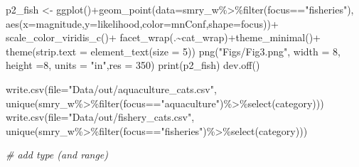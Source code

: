 \documentclass[
]{article}
\newenvironment{Shaded}{\begin{snugshade}}{\end{snugshade}}
\newcommand{\AttributeTok}[1]{\textcolor[rgb]{0.77,0.63,0.00}{#1}}
\newcommand{\CommentTok}[1]{\textcolor[rgb]{0.56,0.35,0.01}{\textit{#1}}}
\newcommand{\DecValTok}[1]{\textcolor[rgb]{0.00,0.00,0.81}{#1}}
\newcommand{\FunctionTok}[1]{\textcolor[rgb]{0.00,0.00,0.00}{#1}}
\newcommand{\NormalTok}[1]{#1}
\newcommand{\OtherTok}[1]{\textcolor[rgb]{0.56,0.35,0.01}{#1}}
\newcommand{\SpecialCharTok}[1]{\textcolor[rgb]{0.00,0.00,0.00}{#1}}
\newcommand{\StringTok}[1]{\textcolor[rgb]{0.31,0.60,0.02}{#1}}
\begin{document}
\begin{Shaded}
\begin{Highlighting}[]
\NormalTok{    p2\_fish }\OtherTok{\textless{}{-}} \FunctionTok{ggplot}\NormalTok{()}\SpecialCharTok{+}\FunctionTok{geom\_point}\NormalTok{(}\AttributeTok{data=}\NormalTok{smry\_w}\SpecialCharTok{\%\textgreater{}\%}\FunctionTok{filter}\NormalTok{(focus}\SpecialCharTok{==}\StringTok{"fisheries"}\NormalTok{),}
                            \FunctionTok{aes}\NormalTok{(}\AttributeTok{x=}\NormalTok{magnitude,}\AttributeTok{y=}\NormalTok{likelihood,}\AttributeTok{color=}\NormalTok{mnConf,}\AttributeTok{shape=}\NormalTok{focus))}\SpecialCharTok{+}
      \FunctionTok{scale\_color\_viridis\_c}\NormalTok{()}\SpecialCharTok{+}
      \FunctionTok{facet\_wrap}\NormalTok{(.}\SpecialCharTok{\textasciitilde{}}\NormalTok{cat\_wrap)}\SpecialCharTok{+}\FunctionTok{theme\_minimal}\NormalTok{()}\SpecialCharTok{+} \FunctionTok{theme}\NormalTok{(}\AttributeTok{strip.text =} \FunctionTok{element\_text}\NormalTok{(}\AttributeTok{size =} \DecValTok{5}\NormalTok{))}
    \FunctionTok{png}\NormalTok{(}\StringTok{"Figs/Fig3.png"}\NormalTok{, }\AttributeTok{width =} \DecValTok{8}\NormalTok{, }\AttributeTok{height =}\DecValTok{8}\NormalTok{, }\AttributeTok{units =} \StringTok{"in"}\NormalTok{,}\AttributeTok{res =} \DecValTok{350}\NormalTok{)}
    \FunctionTok{print}\NormalTok{(p2\_fish)}
    \FunctionTok{dev.off}\NormalTok{()}
    
    \FunctionTok{write.csv}\NormalTok{(}\AttributeTok{file=}\StringTok{"Data/out/aquaculture\_cats.csv"}\NormalTok{,}
              \FunctionTok{unique}\NormalTok{(smry\_w}\SpecialCharTok{\%\textgreater{}\%}\FunctionTok{filter}\NormalTok{(focus}\SpecialCharTok{==}\StringTok{"aquaculture"}\NormalTok{)}\SpecialCharTok{\%\textgreater{}\%}\FunctionTok{select}\NormalTok{(category)))}
    \FunctionTok{write.csv}\NormalTok{(}\AttributeTok{file=}\StringTok{"Data/out/fishery\_cats.csv"}\NormalTok{,}
              \FunctionTok{unique}\NormalTok{(smry\_w}\SpecialCharTok{\%\textgreater{}\%}\FunctionTok{filter}\NormalTok{(focus}\SpecialCharTok{==}\StringTok{"fisheries"}\NormalTok{)}\SpecialCharTok{\%\textgreater{}\%}\FunctionTok{select}\NormalTok{(category)))}
   
   
   \CommentTok{\# add type (and range)}
\end{Highlighting}
\end{Shaded}
\end{document}
